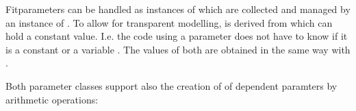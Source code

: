 \documentclass[letterpaper,10pt,english]{sphinxmanual}
\begin{document}
Fitparameters can be handled as instances of {\hyperref[\detokenize{modules-api/parameters:Parameters.Fitparameter}]{}} which are collected and managed by an instance of {\hyperref[\detokenize{modules-api/parameters:Parameters.ParameterPool}]{}}.
To allow for transparent modelling, {\hyperref[\detokenize{modules-api/parameters:Parameters.Fitparameter}]{}} is derived from {\hyperref[\detokenize{modules-api/parameters:Parameters.Parameter}]{}} which can hold a constant value.
I.e. the code using a parameter does not have to know if it is a constant {\hyperref[\detokenize{modules-api/parameters:Parameters.Parameter}]{}} or a variable {\hyperref[\detokenize{modules-api/parameters:Parameters.Fitparameter}]{}}.
The values of both are obtained in the same way with .

Both parameter classes support also the creation of of dependent paramters by arithmetic operations:
\end{document}
